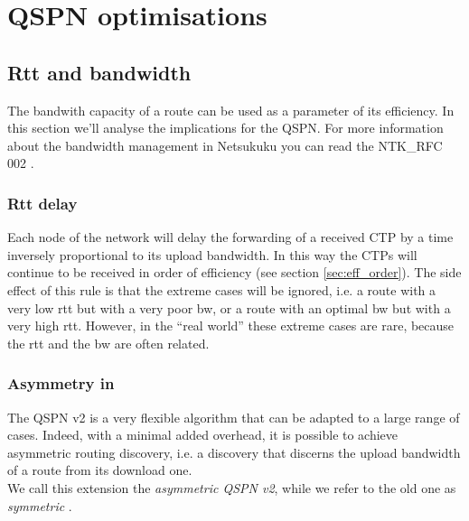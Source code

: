 \documentclass[a4paper]{article}
\begin{document}
\section{QSPN optimisations}
\subsection{Rtt and bandwidth}
\label{sec:bandwidth_q1q2}

The bandwith capacity of a route can be used as a parameter of its
efficiency. In this section we'll analyse the implications for the QSPN.
For more information about the bandwidth management in Netsukuku you can read
the NTK\_RFC 002 \cite{ntkrfc0002}.

\subsubsection{Rtt delay}
\label{sec:rtt_delay}

Each node of the network will delay the forwarding of a received CTP by a time
inversely proportional to its upload bandwidth. In this way the CTPs will
continue to be received in order of efficiency (see section
\ref{sec:eff_order}).
The side effect of this rule is that the extreme cases will be ignored, i.e. a
route with a very low rtt but with a very poor bw, or a route with an optimal
bw but with a very high rtt. However, in the ``real world'' these extreme
cases are rare, because the rtt and the bw are often related.

\subsubsection{Asymmetry in }
The QSPN v2 is a very flexible algorithm that can be adapted to a large range
of cases. Indeed, with a minimal added overhead, it is possible to achieve
asymmetric routing discovery, i.e. a discovery that discerns the upload
bandwidth of a route from its download one.\\
We call this extension the \emph{asymmetric QSPN v2}, while we refer to the
old one as \emph{symmetric }.
\end{document}
